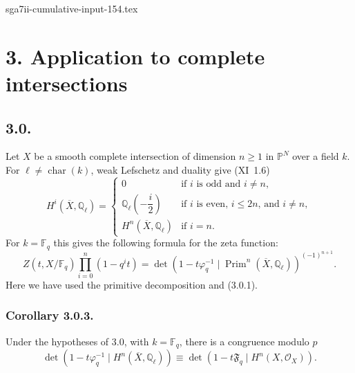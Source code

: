 \begin{filecontents*}{sga7ii-cumulative-input-154.tex}
\section*{3. Application to complete intersections}

\subsection*{3.0.}
Let $X$ be a smooth complete intersection of dimension $n\geq1$ in
$\mathbb P^N$ over a field $k$.  For
$\ell\ne\operatorname{char}(k)$, weak Lefschetz and duality give
(XI~1.6)
\begin{equation}\tag{3.0.1}
H^i(\overline X,\mathbb Q_\ell)=
\begin{cases}
0 & \text{if $i$ is odd and $i\ne n$},\\[1.5ex]
\mathbb Q_\ell\!\left(-\dfrac{i}{2}\right)
  & \text{if $i$ is even, $i\leq2n$, and $i\ne n$},\\[1.5ex]
H^n(\overline X,\mathbb Q_\ell) & \text{if $i=n$}.
\end{cases}
\end{equation}
For $k=\mathbb F_q$ this gives the following formula for the zeta function:
\begin{equation}\tag{3.0.2}
Z(t,X/\mathbb F_q)\prod_{i=0}^{n}(1-q^it)
=\det\!\left(1-t\varphi_q^{-1}\mid
\operatorname{Prim}^n(\overline X,\mathbb Q_\ell)\right)^{(-1)^{n+1}}.
\end{equation}
Here we have used the primitive decomposition and (3.0.1).

\subsubsection*{Corollary 3.0.3.}
Under the hypotheses of 3.0, with $k=\mathbb F_q$, there is a congruence
modulo $p$
\[
\det\!\left(1-t\varphi_q^{-1}\mid
H^n(\overline X,\mathbb Q_\ell)\right)
\equiv
\det\!\left(1-t\mathfrak F_q\mid H^n(X,\mathcal O_X)\right).
\]


\end{filecontents*}
